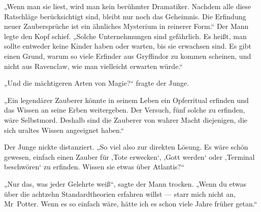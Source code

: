 „Wenn man sie liest, wird man kein berühmter Dramatiker. Nachdem alle diese Ratschläge berücksichtigt sind, bleibt nur noch das Geheimnis. Die Erfindung neuer Zaubersprüche ist ein ähnliches Mysterium in reinerer Form.“ Der Mann legte den Kopf schief.
„Solche Unternehmungen sind gefährlich. Es heißt, man sollte entweder keine Kinder haben oder warten, bis sie erwachsen sind. Es gibt einen Grund, warum so viele Erfinder aus Gryffindor zu kommen scheinen, und nicht aus Ravenclaw, wie man vielleicht erwarten würde.“

„Und die mächtigeren Arten von Magie?“ fragte der Junge.

„Ein legendärer Zauberer könnte in seinem Leben ein Opferritual erfinden und das Wissen an seine Erben weitergeben. Der Versuch, fünf solche zu erfinden, wäre Selbstmord. Deshalb sind die Zauberer von wahrer Macht diejenigen, die sich uraltes Wissen angeeignet haben.“

Der Junge nickte distanziert.
„So viel also zur direkten Lösung. Es wäre schön gewesen, einfach einen Zauber für ‚Tote erwecken‘, ‚Gott werden‘ oder ‚Terminal beschwören‘ zu erfinden. Wissen sie etwas über Atlantis?“

„Nur das, was jeder Gelehrte weiß“, sagte der Mann trocken.
„Wenn du etwas über die achtzehn Standardtheorien erfahren willst — starr mich nicht an, Mr~Potter. Wenn es so einfach wäre, hätte ich es schon viele Jahre früher getan.“

